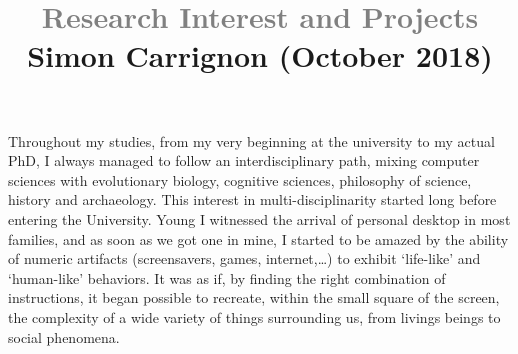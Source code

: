 \documentclass[10pt]{article}
\title{\textcolor{grey}{\Large Research Interest and Projects}\\
\vspace{-.25cm}
{ \normalsize Simon Carrignon (October 2018)}}
\author{}
\date{}
\begin{document}
\maketitle

\vspace{-.5cm}

Throughout my studies, from my very beginning at the university to my actual PhD, I always managed to follow an interdisciplinary path, mixing computer sciences with evolutionary biology, cognitive sciences, philosophy of science, history and archaeology. This interest in multi-disciplinarity started long before entering the University. Young I witnessed the arrival of personal desktop in most families, and as soon as we got one in mine, I started to be amazed by the ability of numeric artifacts (screensavers, games, internet,\ldots) to exhibit ‘life-like’ and ‘human-like’ behaviors. 
It was as if, by finding the right combination of instructions, it began possible to recreate, within the small square of the screen, the complexity of a wide variety of things surrounding us, from livings beings to social phenomena.
\end{document}
